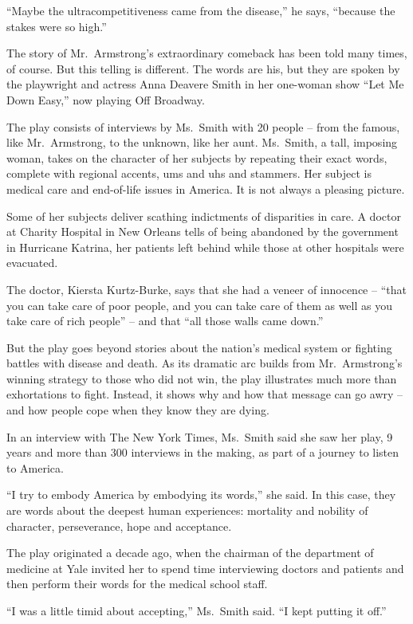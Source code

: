 ﻿\documentclass[12pt]{article}
\begin{document}
``Maybe the ultracompetitiveness came from the disease,'' he says, ``because the stakes were so
high.''

The story of Mr.~Armstrong's extraordinary comeback has been told many times, of course. But this
telling is different. The words are his, but they are spoken by the playwright and actress Anna
Deavere Smith in her one-woman show ``Let Me Down Easy,'' now playing Off Broadway.

The play consists of interviews by Ms.~Smith with 20 people -- from the famous, like Mr.~Armstrong,
to the unknown, like her aunt. Ms.~Smith, a tall, imposing woman, takes on the character of her
subjects by repeating their exact words, complete with regional accents, ums and uhs and stammers.
Her subject is medical care and end-of-life issues in America. It is not always a pleasing picture.

Some of her subjects deliver scathing indictments of disparities in care. A doctor at Charity
Hospital in New Orleans tells of being abandoned by the government in Hurricane Katrina, her
patients left behind while those at other hospitals were evacuated.

The doctor, Kiersta Kurtz-Burke, says that she had a veneer of innocence -- ``that you can take care
of poor people, and you can take care of them as well as you take care of rich people'' -- and that
``all those walls came down.''

But the play goes beyond stories about the nation's medical system or fighting battles with disease
and death. As its dramatic arc builds from Mr.~Armstrong's winning strategy to those who did not
win, the play illustrates much more than exhortations to fight. Instead, it shows why and how that
message can go awry -- and how people cope when they know they are dying.

In an interview with The New York Times, Ms.~Smith said she saw her play, 9 years and more than 300
interviews in the making, as part of a journey to listen to America.

``I try to embody America by embodying its words,'' she said. In this case, they are words about the
deepest human experiences: mortality and nobility of character, perseverance, hope and acceptance.

The play originated a decade ago, when the chairman of the department of medicine at Yale invited
her to spend time interviewing doctors and patients and then perform their words for the medical
school staff.

``I was a little timid about accepting,'' Ms.~Smith said. ``I kept putting it off.''
\end{document}

